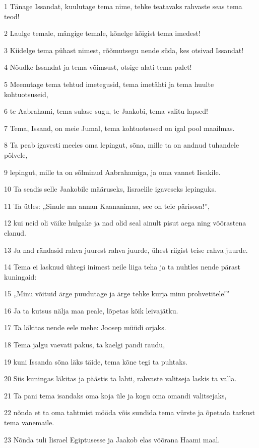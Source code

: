 \par 1 Tänage Issandat, kuulutage tema nime, tehke teatavaks rahvaste seas tema teod!
\par 2 Laulge temale, mängige temale, kõnelge kõigist tema imedest!
\par 3 Kiidelge tema pühast nimest, rõõmutsegu nende süda, kes otsivad Issandat!
\par 4 Nõudke Issandat ja tema võimsust, otsige alati tema palet!
\par 5 Meenutage tema tehtud imetegusid, tema imetähti ja tema huulte kohtuotsuseid,
\par 6 te Aabrahami, tema sulase sugu, te Jaakobi, tema valitu lapsed!
\par 7 Tema, Issand, on meie Jumal, tema kohtuotsused on igal pool maailmas.
\par 8 Ta peab igavesti meeles oma lepingut, sõna, mille ta on andnud tuhandele põlvele,
\par 9 lepingut, mille ta on sõlminud Aabrahamiga, ja oma vannet Iisakile.
\par 10 Ta seadis selle Jaakobile määruseks, Iisraelile igaveseks lepinguks.
\par 11 Ta ütles: „Sinule ma annan Kaananimaa, see on teie pärisosa!”,
\par 12 kui neid oli väike hulgake ja nad olid seal ainult pisut aega ning võõrastena elanud.
\par 13 Ja nad rändasid rahva juurest rahva juurde, ühest riigist teise rahva juurde.
\par 14 Tema ei lasknud ühtegi inimest neile liiga teha ja ta nuhtles nende pärast kuningaid:
\par 15 „Minu võituid ärge puudutage ja ärge tehke kurja minu prohvetitele!”
\par 16 Ja ta kutsus nälja maa peale, lõpetas kõik leivajätku.
\par 17 Ta läkitas nende eele mehe: Joosep müüdi orjaks.
\par 18 Tema jalgu vaevati pakus, ta kaelgi pandi raudu,
\par 19 kuni Issanda sõna läks täide, tema kõne tegi ta puhtaks.
\par 20 Siis kuningas läkitas ja päästis ta lahti, rahvaste valitseja laskis ta valla.
\par 21 Ta pani tema isandaks oma koja üle ja kogu oma omandi valitsejaks,
\par 22 nõnda et ta oma tahtmist mööda võis sundida tema vürste ja õpetada tarkust tema vanemaile.
\par 23 Nõnda tuli Iisrael Egiptusesse ja Jaakob elas võõrana Haami maal.
